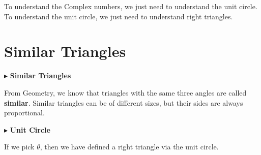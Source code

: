\documentclass{ximera}
\begin{document}
To understand the Complex numbers, we just need to understand the unit circle.  To understand the unit circle, we just need to understand right triangles.














\section*{Similar Triangles}




$\blacktriangleright$ \textbf{\textcolor{blue!75!black}{Similar Triangles}}  

From Geometry, we know that triangles with the same three angles are called \textbf{similar}.  Similar triangles can be of different sizes, but their sides are always proportional.







$\blacktriangleright$ \textbf{\textcolor{blue!75!black}{Unit Circle}}  




If we pick $\theta$, then we have defined a right triangle via the unit circle.
\end{document}
